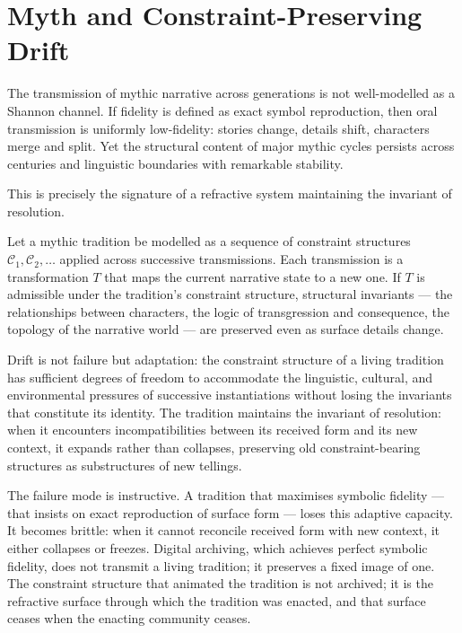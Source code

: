 \documentclass[11pt,openany]{book}
\begin{document}
\section{Myth and Constraint-Preserving Drift}
\label{sec:myth_b}

The transmission of mythic narrative across generations is
not well-modelled as a Shannon channel.  If fidelity is
defined as exact symbol reproduction, then oral transmission
is uniformly low-fidelity: stories change, details shift,
characters merge and split.  Yet the structural content of
major mythic cycles persists across centuries and linguistic
boundaries with remarkable stability.

This is precisely the signature of a refractive system
maintaining the invariant of resolution.

Let a mythic tradition be modelled as a sequence of
constraint structures $\mathcal{C}_1, \mathcal{C}_2,
\ldots$ applied across successive transmissions.  Each
transmission is a transformation $T$ that maps the current
narrative state to a new one.  If $T$ is admissible under
the tradition's constraint structure, structural invariants
--- the relationships between characters, the logic of
transgression and consequence, the topology of the
narrative world --- are preserved even as surface details
change.

Drift is not failure but adaptation: the constraint
structure of a living tradition has sufficient degrees of
freedom to accommodate the linguistic, cultural, and
environmental pressures of successive instantiations without
losing the invariants that constitute its identity.
The tradition maintains the invariant of resolution: when
it encounters incompatibilities between its received form
and its new context, it expands rather than collapses,
preserving old constraint-bearing structures as
substructures of new tellings.

The failure mode is instructive.  A tradition that
maximises symbolic fidelity --- that insists on exact
reproduction of surface form --- loses this adaptive
capacity.  It becomes brittle: when it cannot reconcile
received form with new context, it either collapses or
freezes.  Digital archiving, which achieves perfect
symbolic fidelity, does not transmit a living tradition; it
preserves a fixed image of one.  The constraint structure
that animated the tradition is not archived; it is the
refractive surface through which the tradition was enacted,
and that surface ceases when the enacting community ceases.
\end{document}
